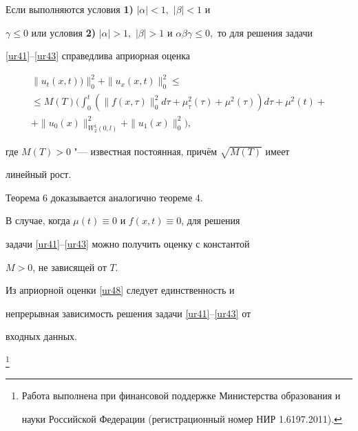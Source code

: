 \smallskip



\begin{theorem}[6]Если выполняются условия {\bf 1)} $|\alpha|<1,$ $|\beta|<1$ и

$\gamma\leq0$ или условия {\bf 2)} $|\alpha|>1,$ $ |\beta|>1$ и $\alpha\beta\gamma\leq0,$ то для решения задачи

\eqref{ur41}--\eqref{ur43} справедлива априорная оценка

\begin{multline}

\|u_t(x,t))\|_0^2+\|u_x(x,t)\|_0^2\leq

\\

\leq

M(T)\biggl(\int_{0}^{t}(\|f(x,\tau)\|_0^2d\tau+\mu_{\tau}^2(\tau)+\mu^2(\tau))d\tau+\mu^2(t)+

\\

+\|u_0(x)\|_{W_2^1(0,l)}^2+\|u_1(x)\|_0^2\biggr),

\label{ur48}

\end{multline}

где $M(T)>0$ "--- известная постоянная, причём $\sqrt{M(T)}$ имеет

линейный рост.

\end{theorem}



\smallskip



Теорема 6 доказывается аналогично теореме 4.



В случае, когда $\mu(t)\equiv 0$ и $f(x,t)\equiv 0$, для решения

задачи \eqref{ur41}--\eqref{ur43} можно получить оценку с константой

$M>0$, не зависящей от $T$.





Из априорной оценки \eqref{ur48} следует единственность и

непрерывная зависимость решения задачи \eqref{ur41}--\eqref{ur43} от

входных данных.





\thanks{Работа выполнена при финансовой поддержке Министерства образования и

науки Российской Федерации (регистрационный номер НИР  1.6197.2011).}





